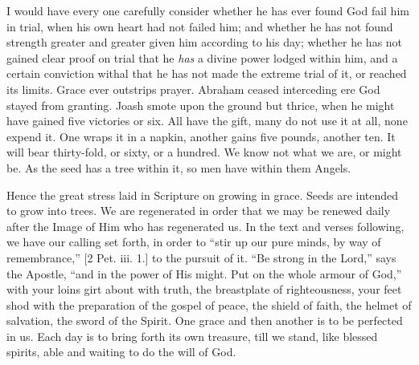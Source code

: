 I would have every one carefully consider whether he has ever found
God fail him in trial, when his own heart had not failed him; and
whether he has not found strength greater and greater given him
according to his day; whether he has not gained clear proof on trial
that he \emph{has} a divine power lodged within him, and a certain conviction
withal that he has not made the extreme trial of it, or reached its
limits. Grace ever outstrips prayer. Abraham ceased interceding ere
God stayed from granting. Joash smote upon the ground but thrice, when
he might have gained five victories or six. All have the gift, many do
not use it at all, none expend it. One wraps it in a napkin, another
gains five pounds, another ten. It will bear thirty-fold, or sixty, or
a hundred. We know not what we are, or might be. As the seed has a
tree within it, so men have within them Angels.

Hence the great stress laid in Scripture on growing in grace. Seeds
are intended to grow into trees. We are regenerated in order that we
may be renewed daily after the Image of Him who has regenerated us. In
the text and verses following, we have our calling set forth, in order
to ``stir up our pure minds, by way of remembrance,'' [2 Pet.
iii. 1.] to the pursuit of it. ``Be strong in the Lord,'' says
the Apostle, ``and in the power of His might. Put on the whole
armour of God,'' with your loins girt about with truth, the
breastplate of righteousness, your feet shod with the preparation of
the gospel of peace, the shield of faith, the helmet of salvation, the
sword of the Spirit. One grace and then another is to be perfected in
us. Each day is to bring forth its own treasure, till we stand, like
blessed spirits, able and waiting to do the will of God.

